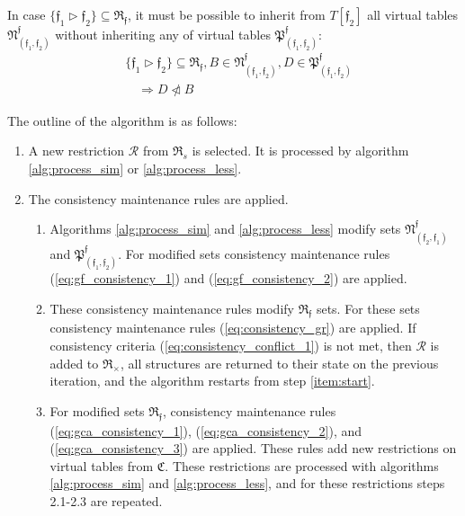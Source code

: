 \documentclass[times, 10pt,twocolumn]{article}
\newcommand{\gC}{\mathfrak{C}}
\newcommand{\gR}{\mathfrak{R}}
\newcommand{\gN}{\mathfrak{N}}
\newcommand{\gP}{\mathfrak{P}}
\newcommand{\gf}{\mathfrak{f}}
\newcommand{\cR}{\mathcal{R}}
\newcommand{\nlhd}{\ntriangleleft}
\begin{document}
In case $\{\gf_1 \rhd \gf_2\} \subseteq \gR_{\gf}$,
it must be possible to inherit from $T[\gf_2]$
all virtual tables $\gN^{\gf}_{(\gf_1, \gf_2)}$
without inheriting any of virtual tables $\gP^{\gf}_{(\gf_1, \gf_2)}$:
\begin{equation}\label{eq:gca_consistency_3}
\begin{aligned}
&\{\gf_1 \rhd \gf_2\} \subseteq \gR_{\gf}, B \in \gN^{\gf}_{(\gf_1, \gf_2)}, D \in \gP^{\gf}_{(\gf_1, \gf_2)} \\
&\quad \Longrightarrow D \nlhd B
\end{aligned}
\end{equation}

The outline of the algorithm is as follows:
\begin{enumerate}
\renewcommand{\theenumii}{\arabic{enumii}}
\renewcommand{\labelenumii}{\theenumi.\theenumii.}
\item A new restriction $\cR$ from $\gR_s$ is selected.
 It is processed by algorithm \ref{alg:process_sim} or \ref{alg:process_less}.
 \label{item:start}
\item The consistency maintenance rules are applied.
 \label{item:check_consistency}
    \begin{enumerate}
    \item Algorithms \ref{alg:process_sim} and \ref{alg:process_less}
          modify sets $\gN^{\gf}_{(\gf_2, \gf_1)}$ and $\gP^{\gf}_{(\gf_1, \gf_2)}$.
          For modified sets consistency maintenance
          rules (\ref{eq:gf_consistency_1}) and (\ref{eq:gf_consistency_2})
          are applied.
          \label{item:consistency_start}
    \item These consistency maintenance rules modify $\gR_{\gf}$ sets.
          For these sets consistency maintenance
          rules (\ref{eq:consistency_gr}) are applied.
          If consistency criteria (\ref{eq:consistency_conflict_1}) is not met,
          then $\cR$ is added to $\gR_{\times}$,
          all structures are returned to their state on the previous iteration,
          and the algorithm restarts from step \ref{item:start}.
    \item For modified sets $\gR_{\gf}$, consistency maintenance
          rules (\ref{eq:gca_consistency_1}), (\ref{eq:gca_consistency_2}),
          and (\ref{eq:gca_consistency_3}) are applied.
          These rules add new restrictions on virtual tables from $\gC$.
          These restrictions are processed with
          algorithms \ref{alg:process_sim} and \ref{alg:process_less},
          and for these restrictions steps 2.1-2.3 are repeated.

\end{enumerate}
\end{enumerate}
\end{document}
